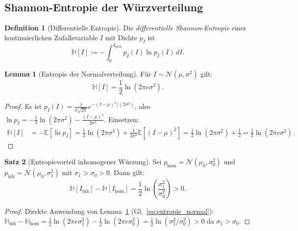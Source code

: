﻿\documentclass[12pt,a4paper]{article}
\theoremstyle{definition}
\newtheorem{definition}{Definition}[section]
\newtheorem{theorem}{Satz}[section]
\newtheorem{lemma}[theorem]{Lemma}
\newcommand{\E}{\mathbb{E}}
\newcommand{\N}{\mathcal{N}}
\begin{document}
\subsection{Shannon-Entropie der Würzverteilung}

\begin{definition}[Differentielle Entropie]
Die \emph{differentielle Shannon-Entropie} einer kontinuierlichen
Zufallsvariable $I$ mit Dichte $p_I$ ist
\begin{equation}
  \mathbb{H}[I] := -\int_0^{I_{\max}} p_I(I) \ln p_I(I)\, dI.
\end{equation}
\end{definition}

\begin{lemma}[Entropie der Normalverteilung]\label{lem:entrop_norm}
Für $I \sim \mathcal{N}(\mu, \sigma^2)$ gilt:
\begin{equation}
  \mathbb{H}[I] = \frac{1}{2}\ln(2\pi e \sigma^2).
  \label{eq:entropie_normal}
\end{equation}
\end{lemma}

\begin{proof}
Es ist
$p_I(I) = \tfrac{1}{\sigma\sqrt{2\pi}} e^{-(I-\mu)^2/(2\sigma^2)}$,
also $\ln p_I = -\tfrac{1}{2}\ln(2\pi\sigma^2) - \tfrac{(I-\mu)^2}{2\sigma^2}$.
Einsetzen:
\begin{align*}
  \mathbb{H}[I] &= -\E[\ln p_I]
  = \tfrac{1}{2}\ln(2\pi\sigma^2) + \tfrac{1}{2\sigma^2}\E[(I-\mu)^2]
  = \tfrac{1}{2}\ln(2\pi\sigma^2) + \tfrac{1}{2}
  = \tfrac{1}{2}\ln(2\pi e\sigma^2).
\end{align*}
\end{proof}

\begin{theorem}[Entropievorteil inhomogener Würzung]\label{thm:entropie}
Sei $p_{\mathrm{hom}} = \N(\mu_0, \sigma_0^2)$ und
$p_{\mathrm{inh}} = \N(\mu_0, \sigma_1^2)$ mit $\sigma_1 > \sigma_0 > 0$.
Dann gilt:
\[
  \mathbb{H}[I_{\mathrm{inh}}] - \mathbb{H}[I_{\mathrm{hom}}]
  = \frac{1}{2}\ln\!\left(\frac{\sigma_1^2}{\sigma_0^2}\right) > 0.
\]
\end{theorem}

\begin{proof}
Direkte Anwendung von Lemma~\ref{lem:entrop_norm}
(Gl.~\ref{eq:entropie_normal}):
$\mathbb{H}_{\mathrm{inh}} - \mathbb{H}_{\mathrm{hom}}
= \tfrac{1}{2}\ln(2\pi e\sigma_1^2) - \tfrac{1}{2}\ln(2\pi e\sigma_0^2)
= \tfrac{1}{2}\ln(\sigma_1^2/\sigma_0^2) > 0$
da $\sigma_1 > \sigma_0$.
\end{proof}
\end{document}
